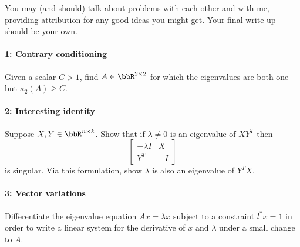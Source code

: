 \documentclass[12pt, leqno]{article} %
\begin{document}

You may (and should) talk about problems with each other and with me,
providing attribution for any good ideas you might get.  Your final
write-up should be your own.

\paragraph*{1: Contrary conditioning}
Given a scalar $C > 1$, find $A \in \bbR^{2 \times 2}$ for which the
eigenvalues are both one but $\kappa_2(A) \geq C$.

\paragraph*{2: Interesting identity}
Suppose $X, Y \in \bbR^{n \times k}$.  Show that if $\lambda \neq 0$
is an eigenvalue of $XY^T$ then
\[
\begin{bmatrix}
  -\lambda I & X \\ Y^T & -I
\end{bmatrix}
\]
is singular.  Via this formulation, show $\lambda$ is also an
eigenvalue of $Y^T X$.

\paragraph*{3: Vector variations}
Differentiate the eigenvalue equation $Ax = \lambda x$ subject
to a constraint $l^* x = 1$ in order to write a linear system
for the derivative of $x$ and $\lambda$ under a small change to $A$.
\end{document}
